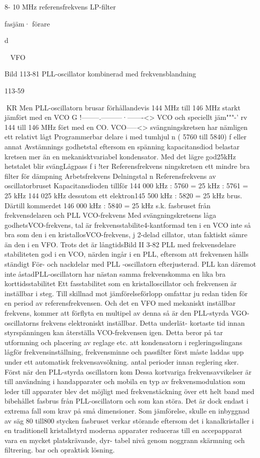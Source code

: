 8- 10 MHz
referensfrekvens
LP-filter

fasjäm·
förare

d

~
VFO

Bild 113-81 PLL-oscillator kombinerad med frekvensblandning

113-59

KR
Men PLL-oscillatorn
brusar
förhållandevis
144 MHz till 146 MHz
starkt jämfört med en
VCO G !--------.---------·-------<>
VCO och speciellt jäm"""-'
rv 144 till 146 MHz
fört
med en CO. VCO-----<>
svängningskretsen har
nämligen ett relativt lågt
Programmerbar delare i med tumhjul
n ( 5760 till 5840)
f eller annat
Avstämnings
godhetstal eftersom en
spänning
kapacitansdiod belastar kretsen mer än en
mekanisktvariabel kondensator.
Med det lägre god25kHz
hetstalet blir svängLågpass f i !ter
Referensfrekvens
ningskretsen ett mindre
bra filter för dämpning
Arbetsfrekvens Delningstal n Referensfrekvens
av oscillatorbruset Kapacitansdioden tillför
144 000 kHz
: 5760
= 25 kHz
: 5761
= 25 kHz
144 025 kHz
dessutom ett elektron145 500 kHz
: 5820
= 25 kHz
brus. Därtill kommerdet
146 000 kHz
: 5840
= 25 kHz
s.k. fasbruset från frekvensdelaren och PLL
VCO-frekvens
Med svängningskretsens låga godhetsVCO-frekvens,
tal är frekvensstabilite4-kantformad
ten i en VCO inte så bra
som den i en kristallosVCO-frekvens,
j 2-delad
cillator, utan faktiskt
sämre än den i en VFO.
Trots det är långtidsBild II 3-82 PLL med frekvensdelare
stabiliteten god i en
VCO, närden ingår i en
PLL, eftersom att frekvensen hålls ständigt
För- och nackdelar med PLL -oscillatorn
efterjusterad. PLL kan däremot inte åstadPLL-oscillatorn har nästan samma frekvenskomma en lika bra korttidsstabilitet Ett fasstabilitet som en kristalloscillator och frekvensen är inställbar i steg. Till skillnad mot jämförelseförlopp omfattar ju redan tiden för
en period av referensfrekvensen. Och det
en VFO med mekaniskt inställbar frekvens,
kommer att förflyta en multipel av denna
så är den PLL-styrda VGO-oscillatorns frekvens elektroniskt inställbar. Detta underlät- kortaste tid innan styrspänningen kan återställa VCO-frekvensen igen. Detta beror på
tar utformning och placering av reglage etc.
att kondensatorn i regleringsslingans lågför frekvensinställning, frekvensminne och
passfilter först måste laddas upp under ett
automatisk frekvensavsökning.
antal perioder innan reglering sker.
Först när den PLL-styrda oscillatorn kom
Dessa kortvariga frekvensavvikelser är
till användning i handapparater och mobila
en typ av frekvensmodulation som leder till
apparater blev det möjligt med frekvenstäckning över ett helt band med bibehållet fasbrus från PLL-oscillatorn och som kan
störa. Det är dock endast i extrema fall som
krav på små dimensioner. Som jämförelse,
skulle en inbyggnad av säg 80 till800 stycken fasbruset verkar störande eftersom det i
kanalkristaller i en traditionell kristallstyrd
moderna apparater reduceras till en accepapparat vara en mycket platskrävande, dyr- tabel nivå genom noggrann skärmning och
filtrering.
bar och opraktisk lösning.

